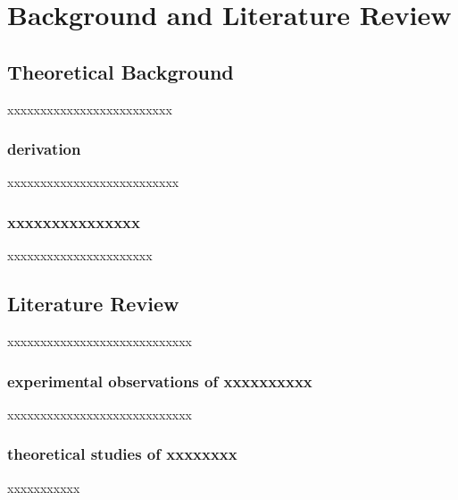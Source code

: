 \chapter{Background and Literature Review}

\section{Theoretical Background}
xxxxxxxxxxxxxxxxxxxxxxxxx

\subsection{derivation}
xxxxxxxxxxxxxxxxxxxxxxxxxx

\subsection{xxxxxxxxxxxxxxx}
xxxxxxxxxxxxxxxxxxxxxx

\section{Literature Review}
xxxxxxxxxxxxxxxxxxxxxxxxxxxx

\subsection{experimental observations of xxxxxxxxxx}
xxxxxxxxxxxxxxxxxxxxxxxxxxxx
\subsection{theoretical studies of xxxxxxxx}
xxxxxxxxxxx